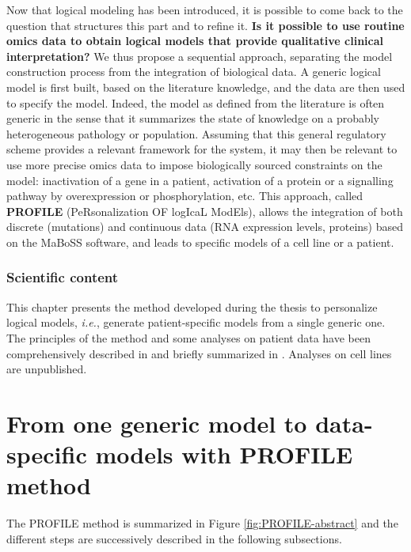 \documentclass[a4paper,12pt,twoside,onecolumn,openright,final,oldfontcommands]{memoir}
\newcommand{\initial}[1]{
	\lettrine[lines=3,lhang=0.33,nindent=0em]{
		\color{gray}
     		{\textsc{#1}}}{}}
\let\BeginKnitrBlock\begin \let\EndKnitrBlock\end
\begin{document}
\initial{N}ow that logical modeling has been introduced, it is possible
to come back to the question that structures this part and to refine it.
\textbf{Is it possible to use routine omics data to obtain logical
models that provide qualitative clinical interpretation?} We thus
propose a sequential approach, separating the model construction process
from the integration of biological data. A generic logical model is
first built, based on the literature knowledge, and the data are then
used to specify the model. Indeed, the model as defined from the
literature is often generic in the sense that it summarizes the state of
knowledge on a probably heterogeneous pathology or population. Assuming
that this general regulatory scheme provides a relevant framework for
the system, it may then be relevant to use more precise omics data to
impose biologically sourced constraints on the model: inactivation of a
gene in a patient, activation of a protein or a signalling pathway by
overexpression or phosphorylation, etc. This approach, called
\textbf{PROFILE} (PeRsonalization OF logIcaL ModEls), allows the
integration of both discrete (mutations) and continuous data (RNA
expression levels, proteins) based on the MaBoSS software, and leads to
specific models of a cell line or a patient.

\BeginKnitrBlock{summarybox}
\subsubsection*{Scientific content}\label{scientific-content-2}

This chapter presents the method developed during the thesis to
personalize logical models, \emph{i.e.}, generate patient-specific
models from a single generic one. The principles of the method and some
analyses on patient data have been comprehensively described in
\citet{beal2019personalization} and briefly summarized in
\citet{beal2020personalized}. Analyses on cell lines are unpublished.
\EndKnitrBlock{summarybox}

\section{From one generic model to data-specific models with PROFILE
method}\label{from-one-generic-model-to-data-specific-models-with-profile-method}

The PROFILE method is summarized in Figure \ref{fig:PROFILE-abstract}
and the different steps are successively described in the following
subsections.
\end{document}
